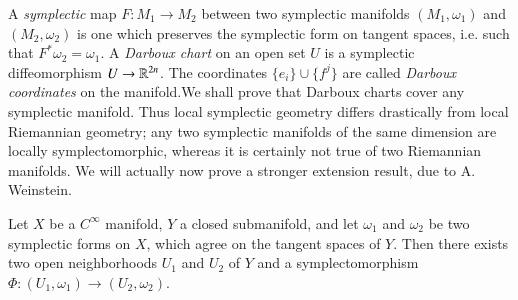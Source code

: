 A \emph{symplectic} map $F: M_1 \to M_2$ between two symplectic manifolds $(M_1,\omega_1)$ and $(M_2,\omega_2)$ is one which preserves the symplectic form on tangent spaces, i.e. such that $F^* \omega_2 = \omega_1$. A \emph{Darboux chart} on an open set $U$ is a symplectic diffeomorphism $U \to \operatorname{\mathbb{R}}^{2n}$. The coordinates $\{ e_i \} \cup \{ f^j \}$ are called \emph{Darboux coordinates} on the manifold.We shall prove that Darboux charts cover any symplectic manifold. Thus local symplectic geometry differs drastically from local Riemannian geometry; any two symplectic manifolds of the same dimension are locally symplectomorphic, whereas it is certainly not true of two Riemannian manifolds. We will actually now prove a stronger extension result, due to A. Weinstein.

\begin{theorem}
    Let $X$ be a $C^\infty$ manifold, $Y$ a closed submanifold, and let $\omega_1$ and $\omega_2$ be two symplectic forms on $X$, which agree on the tangent spaces of $Y$. Then there exists two open neighborhoods $U_1$ and $U_2$ of $Y$ and a symplectomorphism $\Phi: (U_1,\omega_1) \to (U_2,\omega_2)$.
\end{theorem}
